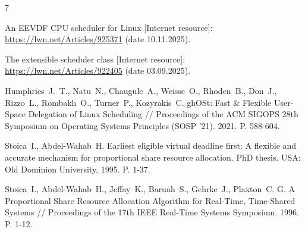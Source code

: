 \documentclass[a4paper]{article}
\begin{document}
\begin{thebibliography}{7}

An EEVDF CPU scheduler for Linux [Internet resource]:\\
\url{https://lwn.net/Articles/925371} (date 10.11.2025).

The extensible scheduler class
[Internet resource]:\\
\url{https://lwn.net/Articles/922405} (date 03.09.2025).

Humphries~J.~T., Natu~N., Chaugule~A., Weisse~O., Rhoden~B., Don~J., Rizzo~L., Rombakh~O., Turner~P., Kozyrakis~C. ghOSt: Fast \& Flexible User-Space Delegation of Linux Scheduling // Proceedings of the ACM SIGOPS 28th Symposium on Operating Systems Principles (SOSP '21). 2021. P. 588-604.

 Stoica~I., Abdel-Wahab~H.
Earliest eligible virtual deadline first: A flexible and accurate mechanism
for proportional share resource allocation. PhD thesis. USA: Old Dominion University, 1995. P. 1-37.

Stoica~I., Abdel-Wahab~H., Jeffay~K., Baruah~S., Gehrke~J., Plaxton~C. G. A Proportional Share Resource Allocation Algorithm for Real-Time, Time-Shared Systems // Proceedings of the 17th IEEE Real-Time Systems Symposium. 1996. P. 1-12.



\end{thebibliography}
\end{document}
